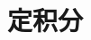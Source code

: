 \documentclass[color=green,titlestyle=hang]{elegantbook}%
\begin{document}
\section{定积分}

%
%
%
\end{document}
